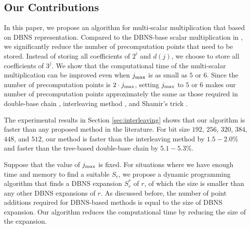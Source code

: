 \subsection{Our Contributions}

In this paper, we propose an algorithm for multi-scalar multiplication that based on DBNS representation.
Compared to the DBNS-base scalar multiplication in \cite{MH09},
we significantly reduce the number of precomputation points that need to be stored.
Instead of storing all coefficients of $2^i$ and $d(j)$, we choose to store all coefficients of $3^j$.
We show that the computational time of the multi-scalar multiplication can be improved even when $j_{\rm max}$ is as small as $5$ or $6$.
Since the number of precomputation points is $2 \cdot j_{\rm max}$,
setting $j_{\rm max}$ to $5$ or $6$ makes our number of precomputation points approximately the same as those required in
double-base chain \cite{experiment,DKS09}, interleaving method \cite{interleaving}, and Shamir's trick \cite{enlarged4}.

The experimental results in Section \ref{sec:interleaving} shows that our algorithm is faster than any proposed method in the literature.
For bit size $192$, $256$, $320$, $384$, $448$, and $512$,
our method is faster than the interleaving method by $1.5 - 2.0\%$
and faster than the tree-based double-base chain by $5.1 - 5.3\%$.

Suppose that the value of $j_{\rm max}$ is fixed.
For situations where we have enough time and memory to find a suitable $S_r$,
we propose a dynamic programming algorithm that finds a DBNS expansion $S^*_r$ of $r$, of which the size is smaller than any other DBNS expansions of $r$.
As discussed before, the number of point additions required for DBNS-based methods is equal to the size of DBNS expansion.
Our algorithm reduces the computational time by reducing the size of the expansion.


